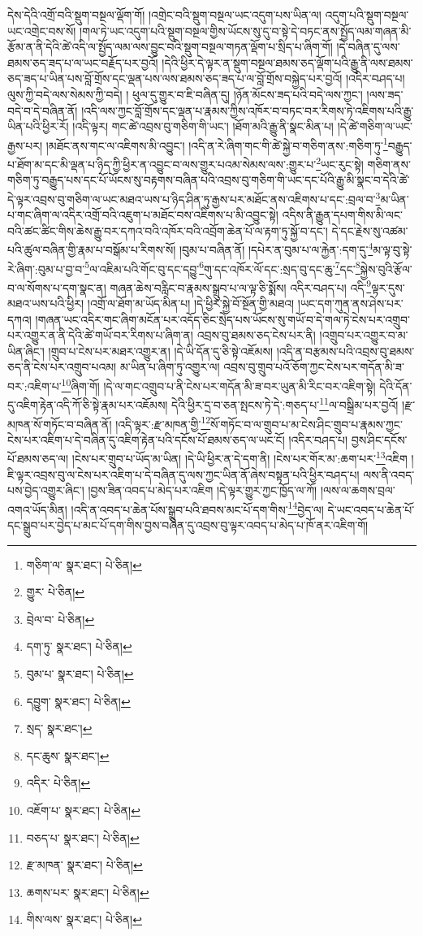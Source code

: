 དེས་དེའི་འགྲོ་བའི་སྡུག་བསྔལ་ལྡོག་གོ། །འགྲེང་བའི་སྡུག་བསྔལ་ཡང་འདུག་པས་ཡིན་ལ། འདུག་པའི་སྡུག་བསྔལ་ཡང་འགྲེང་བས་སོ། །གལ་ཏེ་ཡང་འདུག་པའི་སྡུག་བསྔལ་གྱིས་ཡོངས་སུ་དུ་བ་སྟེ་དེ་བཏང་ནས་སྤྱོད་ལམ་གཞན་མི་རྩོམ་ན་ནི་དེའི་ཚེ་འདི་ལ་སྤྱོད་ལམ་ལས་བྱུང་བའི་སྡུག་བསྔལ་གཏན་ལྡོག་པ་སྲིད་པ་ཞིག་གོ། །དེ་བཞིན་དུ་ལས་ཐམས་ཅད་ཟད་པ་ལ་ཡང་བརྗོད་པར་བྱའོ། །དེའི་ཕྱིར་དེ་ལྟར་ན་སྡུག་བསྔལ་ཐམས་ཅད་ལྡོག་པའི་རྒྱུ་ནི་ལས་ཐམས་ཅད་ཟད་པ་ཡིན་པས་བློ་གྲོས་དང་ལྡན་པས་ལས་ཐམས་ཅད་ཟད་པ་ལ་བློ་གྲོས་བསྐྱེད་པར་བྱའོ། །འདིར་བཤད་པ། ལུས་ཀྱི་བདེ་ལས་སེམས་ཀྱི་བདེ། །
ཕུལ་དུ་གྱུར་བ་ཇི་བཞིན་དུ། །ཉོན་མོངས་ཟད་པའི་བདེ་ལས་ཀྱང་། །ལས་ཟད་བདེ་བ་དེ་བཞིན་ནོ། །འདི་ལས་ཀྱང་བློ་གྲོས་དང་ལྡན་པ་རྣམས་ཀྱིས་འཁོར་བ་བཏང་བར་རིགས་ཏེ་འཇིགས་པའི་རྒྱུ་ཡིན་པའི་ཕྱིར་རོ། །འདི་ལྟར། གང་ཚེ་འབྲས་བུ་གཅིག་གི་ཡང་། །ཐོག་མའི་རྒྱུ་ནི་སྣང་མིན་པ། །དེ་ཚེ་གཅིག་ལ་ཡང་རྒྱས་པར། །མཐོང་ནས་གང་ལ་འཇིགས་མི་འབྱུང་། །འདི་ན་རེ་ཞིག་གང་གི་ཚེ་སྐྱེ་བ་གཅིག་ནས་:གཅིག་ཏུ་\footnote{གཅིག་ལ་  སྣར་ཐང་།  པེ་ཅིན། }བརྒྱུད་པ་ཐོག་མ་དང་མི་ལྡན་པ་ཉིད་ཀྱི་ཕྱིར་ན་འབྱུང་བ་ལས་གྱུར་པའམ་སེམས་ལས་:གྱུར་པ་\footnote{གྱུར་  པེ་ཅིན། }ཡང་རུང་སྟེ། གཅིག་ནས་གཅིག་ཏུ་བརྒྱུད་པས་དང་པོ་ཡོངས་སུ་བརྟགས་བཞིན་པའི་འབྲས་བུ་གཅིག་གི་ཡང་དང་པོའི་རྒྱུ་མི་སྣང་བ་དེའི་ཚེ་དེ་ལྟར་འབྲས་བུ་གཅིག་ལ་ཡང་མཐའ་ཡས་པ་ཉིད་ཤིན་ཏུ་རྒྱས་པར་མཐོང་ནས་འཇིགས་པ་དང་:བྲལ་བ་\footnote{བྲེལ་བ་  པེ་ཅིན། }མ་ཡིན་པ་གང་ཞིག་ལ་འདིར་འགྲོ་བའི་འཇུག་པ་མཐོང་བས་འཇིགས་པ་མི་འབྱུང་སྟེ། འདིས་ནི་རྒྱུན་དཔག་གིས་མི་ལང་བའི་ཚང་ཚིང་གིས་ཆེས་རྒྱུ་བར་དཀའ་བའི་འཁོར་བའི་འབྲོག་ཆེན་པོ་ལ་རྟག་ཏུ་སྐྱོ་བ་དང་། དེ་དང་རྗེས་སུ་འཚམ་པའི་ཚུལ་བཞིན་གྱི་རྣམ་པ་བསྒོམ་པ་རིགས་སོ། །བུམ་པ་བཞིན་ནོ། །དཔེར་ན་བུམ་པ་ལ་རྐྱེན་:དག་དུ་\footnote{དག་ཏུ་  སྣར་ཐང་།  པེ་ཅིན། }མ་ལྟ་བུ་སྟེ་རེ་ཞིག་:བུམ་པ་བྱ་བ་\footnote{བུམ་པ་  སྣར་ཐང་།  པེ་ཅིན། }ལ་འཇིམ་པའི་གོང་བུ་དང་དབྱུ་\footnote{དབྱུག་  སྣར་ཐང་།  པེ་ཅིན། }གུ་དང་འཁོར་ལོ་དང་:སྲད་བུ་དང་ཆུ་\footnote{སྲད་  སྣར་ཐང་། }དང་\footnote{དང་ཆུས་  སྣར་ཐང་། }སྐྱེས་བུའི་རྩོལ་བ་ལ་སོགས་པ་དག་སྣང་ན། གཞན་ཆེས་བརླིང་བ་རྣམས་སྒྲུབ་པ་ལ་ལྟ་ཅི་སྨོས། འདིར་བཤད་པ། འདི་\footnote{འདིར་  པེ་ཅིན། }ལྟར་དུས་མཐའ་ཡས་པའི་ཕྱིར། །འགྲོ་ལ་ཐོག་མ་ཡོད་མིན་པ། །དེ་ཕྱིར་སྐྱེ་བོ་སྔོན་གྱི་མཐའ། །ཡང་དག་ཀུན་ནས་ཤེས་པར་དཀའ། །གཞན་ཡང་འདིར་གང་ཞིག་མངོན་པར་འདོད་ཅིང་སྲེད་པས་ཡོངས་སུ་གཡོ་བ་དེ་གལ་ཏེ་ངེས་པར་འགྲུབ་པར་འགྱུར་ན་ནི་དེའི་ཚེ་གཡོ་བར་རིགས་པ་ཞིག་ན། འབྲས་བུ་ཐམས་ཅད་ངེས་པར་ནི། །འགྲུབ་པར་འགྱུར་བ་མ་ཡིན་ཞིང་། །གྲུབ་པ་ངེས་པར་མཐར་འགྱུར་ན། །དེ་ཡི་དོན་དུ་ཅི་སྟེ་འཇོམས། །འདི་ན་བརྩམས་པའི་འབྲས་བུ་ཐམས་ཅད་ནི་ངེས་པར་འགྲུབ་པའམ། མ་ཡིན་པ་ཞིག་ཏུ་འགྱུར་ལ། འབྲས་བུ་གྲུབ་པའོ་ཅོག་ཀྱང་ངེས་པར་གདོན་མི་ཟ་བར་:འཇིག་པ་\footnote{འཇོག་པ་  སྣར་ཐང་།  པེ་ཅིན། }ཞིག་གོ། །དེ་ལ་གང་འགྲུབ་པ་ནི་ངེས་པར་གདོན་མི་ཟ་བར་ཡུན་མི་རིང་བར་འཇིག་སྟེ། དེའི་དོན་དུ་འཇིག་རྟེན་འདི་ཀོ་ཅི་སྟེ་རྣམ་པར་འཇོམས། དེའི་ཕྱིར་དྲ་བ་ཅན་སྤངས་ཏེ་དེ་:གཅད་པ་\footnote{བཅད་པ་  སྣར་ཐང་།  པེ་ཅིན། }ལ་བསྒྲིམ་པར་བྱའོ། །རྫ་མཁན་སོ་གཏོང་བ་བཞིན་ནོ། །འདི་ལྟར་:རྫ་མཁན་གྱི་\footnote{རྫ་མཁན་  སྣར་ཐང་།  པེ་ཅིན། }སོ་གཏོང་བ་ལ་གྲུབ་པ་མ་ངེས་ཤིང་གྲུབ་པ་རྣམས་ཀྱང་ངེས་པར་འཇིག་པ་དེ་བཞིན་དུ་འཇིག་རྟེན་པའི་དངོས་པོ་ཐམས་ཅད་ལ་ཡང་ངོ། །འདིར་བཤད་པ། བྱས་ཤིང་དངོས་པོ་ཐམས་ཅད་ལ། །ངེས་པར་གྲུབ་པ་ཡོད་མ་ཡིན། །དེ་ཡི་ཕྱིར་ན་དེ་དག་ནི། །ངེས་པར་གོར་མ་:ཆག་པར་\footnote{ཆགས་པར་  སྣར་ཐང་།  པེ་ཅིན། }འཇིག །ཇི་ལྟར་འབྲས་བུ་ལ་ངེས་པར་འཇིག་པ་དེ་བཞིན་དུ་ལས་ཀྱང་ཡིན་ནོ་ཞེས་བསྟན་པའི་ཕྱིར་བཤད་པ། ལས་ནི་འབད་པས་བྱེད་འགྱུར་ཞིང་། །བྱས་ཟིན་འབད་པ་མེད་པར་འཇིག །དེ་ལྟར་གྱུར་ཀྱང་ཁྱོད་ལ་ཀོ། །ལས་ལ་ཆགས་བྲལ་འགའ་ཡོད་མིན། །འདི་ན་འབད་པ་ཆེན་པོས་སྒྲུབ་པའི་ཐབས་མང་པོ་དག་གིས་\footnote{གིས་ལས་  སྣར་ཐང་།  པེ་ཅིན། }བྱེད་ལ། དེ་ཡང་འབད་པ་ཆེན་པོ་དང་སྒྲུབ་པར་བྱེད་པ་མང་པོ་དག་གིས་བྱས་བཞིན་དུ་འབྲས་བུ་ལྟར་འབད་པ་མེད་པ་ཁོ་ནར་འཇིག་གོ། 